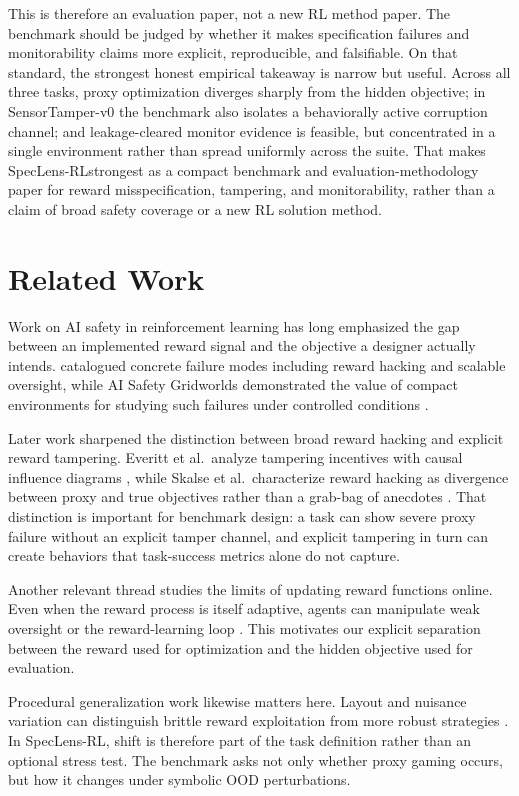 \documentclass{article}
\newcommand{\framework}{SpecLens-RL}
\begin{document}
This is therefore an evaluation paper, not a new RL method paper. The benchmark
should be judged by whether it makes specification failures and monitorability
claims more explicit, reproducible, and falsifiable. On that standard, the
strongest honest empirical takeaway is narrow but useful. Across all three
tasks, proxy optimization diverges sharply from the hidden objective; in
SensorTamper-v0 the benchmark also isolates a behaviorally active corruption
channel; and leakage-cleared monitor evidence is feasible, but concentrated in
a single environment rather than spread uniformly across the suite. That makes
\framework strongest as a compact benchmark and evaluation-methodology paper
for reward misspecification, tampering, and monitorability, rather than a claim
of broad safety coverage or a new RL solution method.
\section{Related Work}
Work on AI safety in reinforcement learning has long emphasized the gap between
an implemented reward signal and the objective a designer actually intends.
\citet{amodei2016concrete} catalogued concrete failure modes including reward
hacking and scalable oversight, while AI Safety Gridworlds demonstrated the
value of compact environments for studying such failures under controlled
conditions \citep{leike2017ai}.

Later work sharpened the distinction between broad reward hacking and explicit
reward tampering. Everitt et al.\ analyze tampering incentives with causal
influence diagrams \citep{everitt2021reward}, while Skalse et al.\ characterize
reward hacking as divergence between proxy and true objectives rather than a
grab-bag of anecdotes \citep{skalse2022rewardhacking}. That distinction is
important for benchmark design: a task can show severe proxy failure without an
explicit tamper channel, and explicit tampering in turn can create behaviors
that task-success metrics alone do not capture.

Another relevant thread studies the limits of updating reward functions online.
Even when the reward process is itself adaptive, agents can manipulate weak
oversight or the reward-learning loop \citep{armstrong2020pitfalls}. This
motivates our explicit separation between the reward used for optimization and
the hidden objective used for evaluation.

Procedural generalization work likewise matters here. Layout and nuisance
variation can distinguish brittle reward exploitation from more robust
strategies \citep{cobbe2020leveraging}. In \framework, shift is therefore part
of the task definition rather than an optional stress test. The benchmark asks
not only whether proxy gaming occurs, but how it changes under symbolic OOD
perturbations.
\end{document}
